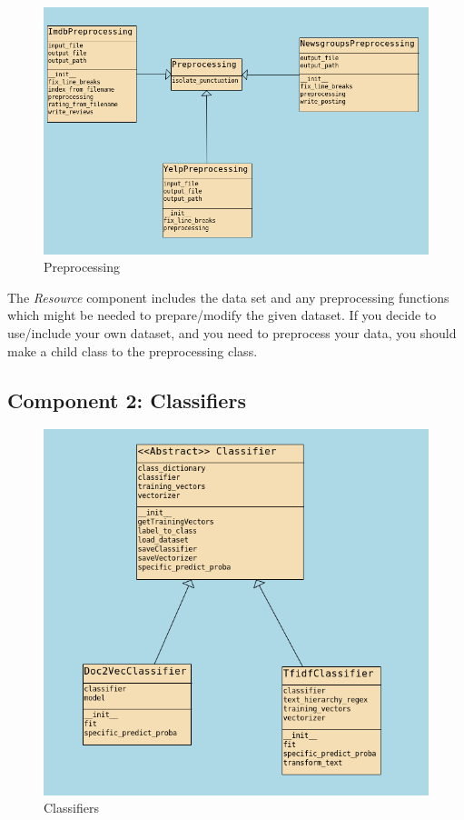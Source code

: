 \begin{figure}[H]
    \centering
    \includegraphics[width=\linewidth]{images/05_framework_eval/Preprocessing.png}
    \caption{Preprocessing}
    \label{fig:preprocessing}
\end{figure}

The \textit{Resource} component includes the data set and any preprocessing functions which might be needed to prepare/modify the given dataset. If you decide to use/include your own dataset, and you need to preprocess your data, you should make a child class to the preprocessing class.

\subsection{Component 2: Classifiers}

\begin{figure}[H]
    \centering
    \includegraphics[width=\linewidth]{images/05_framework_eval/Classifiers.png}
    \caption{Classifiers}
    \label{fig:Classifiers}
\end{figure}

